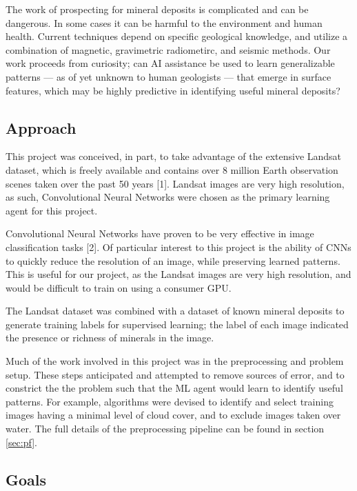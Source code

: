 \documentclass[10pt]{article}
\begin{document}
The work of prospecting for mineral deposits is complicated and can be dangerous.
In some cases it can be harmful to the environment and human health. Current
techniques depend on specific geological knowledge, and utilize a combination of
magnetic, gravimetric radiometirc, and seismic methods. Our work proceeds from
curiosity; can AI assistance be used to learn generalizable patterns — as of yet
unknown to human geologists — that emerge in surface features, which may be highly
predictive in identifying useful mineral deposits?

\subsection{Approach}

This project was conceived, in part, to take advantage of the extensive Landsat
dataset, which is freely available and contains over 8 million Earth observation
scenes taken over the past 50 years [1]. Landsat images are very high resolution,
as such, Convolutional Neural Networks were chosen as the primary learning agent
for this project. 

Convolutional Neural Networks have proven to be very effective in image classification
tasks [2]. Of particular interest to this project is the ability of CNNs to
quickly reduce the resolution of an image, while preserving learned patterns.
This is useful for our project, as the Landsat images are very high resolution,
and would be difficult to train on using a consumer GPU.

The Landsat dataset was combined with a dataset of known mineral deposits to
generate training labels for supervised learning; the label of each image
indicated the presence or richness of minerals in the image.

Much of the work involved in this project was in the preprocessing and problem
setup. These steps anticipated and attempted to remove sources of error, and to
constrict the the problem such that the ML agent would learn to identify useful
patterns. For example, algorithms were devised to identify and select training
images having a minimal level of cloud cover, and to exclude images taken
over water. The full details of the preprocessing pipeline can be found
in section \ref{sec:pf}.

\subsection{Goals}
\end{document}
